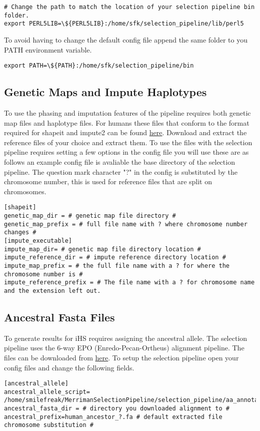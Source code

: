 \documentclass[a4paper,10pt]{article}
\begin{document}
\begin{verbatim}
# Change the path to match the location of your selection pipeline bin folder.
export PERL5LIB=\${PERL5LIB}:/home/sfk/selection_pipeline/lib/perl5
\end{verbatim}

To avoid having to change the default config file append the same folder to you PATH environment variable.\\
\begin{verbatim}
export PATH=\${PATH}:/home/sfk/selection_pipeline/bin
\end{verbatim}

\subsection{Genetic Maps and Impute Haplotypes}
To use the phasing and imputation features of the pipeline requires both genetic map files and haplotype files. For humans these files that conform to the format required for shapeit and impute2 can be found \href{http://mathgen.stats.ox.ac.uk/impute/impute_v2.html#reference}{here}. Download and extract the reference files of your choice and extract them. To use the files with the selection pipeline requires setting a few options in the config file you will use these are as follows an example config file is avaliable the base directory of the selection pipeline. The question mark character "?" in the config is substituted by the chromosome number, this is used for reference files that are split on chromosomes. \\
\begin{verbatim}
[shapeit]
genetic_map_dir = # genetic map file directory #
genetic_map_prefix = # full file name with ? where chromosome number changes #
[impute_executable]
impute_map_dir= # genetic map file directory location #
impute_reference_dir = # impute reference directory location #
impute_map_prefix = # the full file name with a ? for where the chromosome number is #
impute_reference_prefix = # The file name with a ? for chromosome name and the extension left out. 
\end{verbatim}
\subsection{Ancestral Fasta Files}
To generate results for iHS requires assigning the ancestral allele. The selection pipeline uses the 6-way EPO (Enredo-Pecan-Ortheus) alignment pipeline. The files can be downloaded from \href{ftp://ftp.1000genomes.ebi.ac.uk/vol1/ftp/phase1/analysis_results/supporting/ancestral_alignments/human_ancestor_GRCh37_e59.tar.bz2}{here}. To setup the selection pipeline 
open your config files and change the following fields.\\
\begin{verbatim}
[ancestral_allele]
ancestral_allele_script= /home/smilefreak/MerrimanSelectionPipeline/selection_pipeline/aa_annotate.py
ancestral_fasta_dir = # directory you downloaded alignment to #
ancestral_prefix=human_ancestor_?.fa # default extracted file chromosome substitution #
\end{verbatim}
\end{document}
